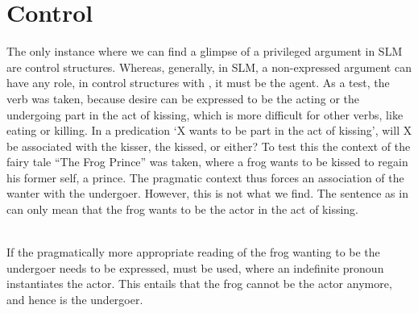 \section{Control}\label{sec:grel:Control}
The only instance where we can find  a glimpse of a privileged argument in SLM are control structures. Whereas, generally, in SLM, a non-expressed argument can have any role, in control structures with , it must be the agent. As a test, the verb  was taken, because desire can be expressed to be the acting or the undergoing part in the act of kissing, which is more difficult for other verbs, like eating or killing. In a predication `X wants to be part in the act of kissing', will X be associated with the kisser, the kissed, or either? To test this the context of the fairy tale ``The Frog Prince'' was taken, where a frog wants to be kissed to regain his former self, a prince. The pragmatic context thus forces an association of the wanter with the undergoer. However, this is not what we find. The sentence as in  can only mean that the frog wants to be the actor in the act of kissing.


 \\

If the pragmatically more appropriate reading of the frog wanting to be the undergoer needs to be expressed,  must be used, where an indefinite pronoun  instantiates the actor. This entails that the frog cannot be the actor anymore, and hence is the undergoer.



 \\

